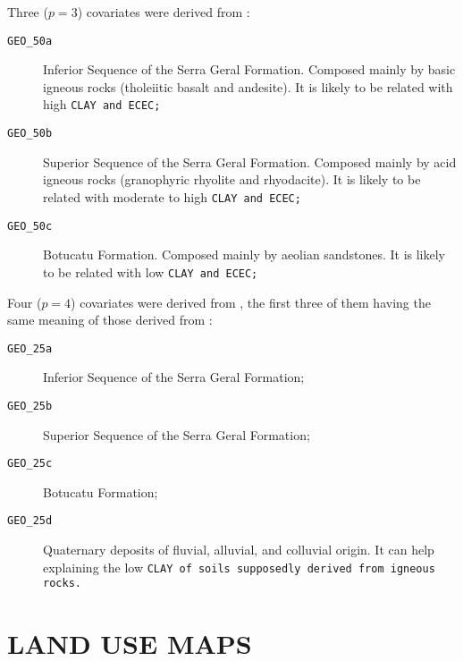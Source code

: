 
Three ($p = 3$) covariates were derived from \geoOld{}:

\begin{description}
 \item[\tt{GEO\_50a}] Inferior Sequence of the Serra Geral Formation. Composed mainly by basic 
 igneous rocks (tholeiitic basalt and andesite). It is likely to be related with high \tt{CLAY} and 
 \tt{ECEC};
 
 \item[\tt{GEO\_50b}] Superior Sequence of the Serra Geral Formation. Composed mainly by acid 
 igneous rocks (granophyric rhyolite and rhyodacite). It is likely to be related with moderate to 
 high \tt{CLAY} and \tt{ECEC};
 
 \item[\tt{GEO\_50c}] Botucatu Formation. Composed mainly by aeolian sandstones. It is likely 
 to be related with low \tt{CLAY} and \tt{ECEC};
\end{description}

Four ($p = 4$) covariates were derived from \geoNew{}, the first three of them having the same meaning 
of those derived from \geoOld{}:

\begin{description}
 \item[\tt{GEO\_25a}] Inferior Sequence of the Serra Geral Formation;
 
 \item[\tt{GEO\_25b}] Superior Sequence of the Serra Geral Formation;
 
 \item[\tt{GEO\_25c}] Botucatu Formation;
 
 \item[\tt{GEO\_25d}] Quaternary deposits of fluvial, alluvial, and colluvial 
 origin. It can help explaining the low \tt{CLAY} of soils supposedly derived from igneous rocks.
\end{description}

\section{LAND USE MAPS}
\label{sec:covar-data-land-use}

